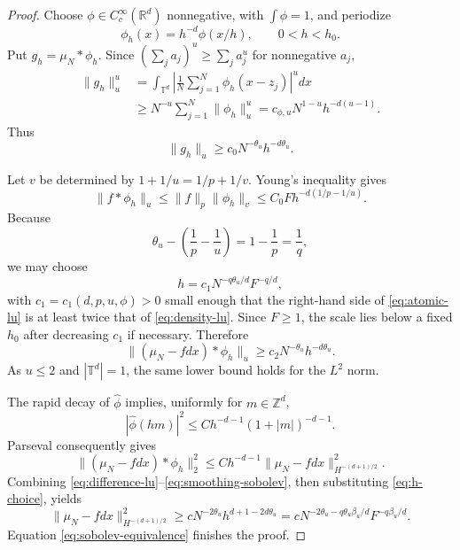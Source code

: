 \documentclass[11pt]{article}
\newcommand{\T}{\mathbb T}
\begin{document}
\begin{proof}
Choose $\phi\in C_c^\infty(\mathbb R^d)$ nonnegative, with
$\int\phi=1$, and periodize
\[
 \phi_h(x)=h^{-d}\phi(x/h),\qquad 0<h<h_0.
\]
Put $g_h=\mu_N*\phi_h$.  Since $(\sum_j a_j)^u\ge\sum_j a_j^u$ for
nonnegative $a_j$,
\begin{align}
 \|g_h\|_u^u
 &=\int_{\T^d}\left|\frac1N\sum_{j=1}^N
          \phi_h(x-z_j)\right|^u dx \\
 &\ge N^{-u}\sum_{j=1}^N\|\phi_h\|_u^u
 =c_{\phi,u}N^{1-u}h^{-d(u-1)}.
\end{align}
Thus
\begin{equation}\label{eq:atomic-lu}
 \|g_h\|_u\ge c_0N^{-\theta_u}h^{-d\theta_u}.
\end{equation}

Let $v$ be determined by
$1+1/u=1/p+1/v$.  Young's inequality gives
\begin{equation}\label{eq:density-lu}
 \|f*\phi_h\|_u
 \le \|f\|_p\|\phi_h\|_v
 \le C_0Fh^{-d(1/p-1/u)}.
\end{equation}
Because
\[
 \theta_u-\left(\frac1p-\frac1u\right)=1-\frac1p=\frac1q,
\]
we may choose
\begin{equation}\label{eq:h-choice}
 h=c_1N^{-q\theta_u/d}F^{-q/d},
\end{equation}
with $c_1=c_1(d,p,u,\phi)>0$ small enough that the right-hand side of
\eqref{eq:atomic-lu} is at least twice that of
\eqref{eq:density-lu}.  Since $F\ge1$, the scale lies below a fixed $h_0$
after decreasing $c_1$ if necessary.  Therefore
\begin{equation}\label{eq:difference-lu}
 \|(\mu_N-fdx)*\phi_h\|_u
 \ge c_2N^{-\theta_u}h^{-d\theta_u}.
\end{equation}
As $u\le2$ and $|\T^d|=1$, the same lower bound holds for the $L^2$ norm.

The rapid decay of $\widehat\phi$ implies, uniformly for $m\in\mathbb Z^d$,
\[
 |\widehat\phi(hm)|^2
 \le C h^{-d-1}(1+|m|)^{-d-1}.
\]
Parseval consequently gives
\begin{equation}\label{eq:smoothing-sobolev}
 \|(\mu_N-fdx)*\phi_h\|_2^2
 \le Ch^{-d-1}\|\mu_N-fdx\|_{H^{-(d+1)/2}}^2.
\end{equation}
Combining \eqref{eq:difference-lu}--\eqref{eq:smoothing-sobolev}, then
substituting \eqref{eq:h-choice}, yields
\[
 \|\mu_N-fdx\|_{H^{-(d+1)/2}}^2
 \ge cN^{-2\theta_u}h^{d+1-2d\theta_u}
 =cN^{-2\theta_u-q\theta_u\beta_u/d}F^{-q\beta_u/d}.
\]
Equation \eqref{eq:sobolev-equivalence} finishes the proof.
\end{proof}
\end{document}
